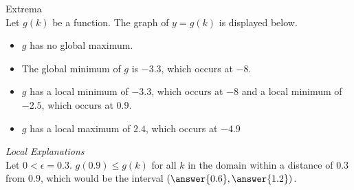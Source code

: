 \documentclass{ximera}
\begin{document}
\begin{example} Extrema \\

Let $g(k)$ be a function.  The graph of $y= g(k)$ is displayed below. 

\begin{image}
\end{image}

\begin{itemize}
\item $g$ has no global maximum.
\item The global minimum of $g$ is $-3.3$, which occurs at $-8$.
\item $g$ has a local minimum of $-3.3$, which occurs at $-8$ and a local minimum of $-2.5$, which occurs at $0.9$.
\item $g$ has a local maximum of $2.4$, which occurs at $-4.9$
\end{itemize}

\end{example}




\textit{Local Explanations} \\



Let $0 < \epsilon = 0.3$.  $g(0.9) \leq g(k)$ for all $k$ in the domain within a distance of $0.3$ from $0.9$, which would be the interval $\left(\answer{0.6}, \answer{1.2}\right)$.
\end{document}

